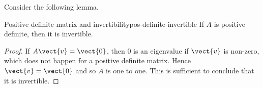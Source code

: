 
Consider the following lemma.

\begin{lemma}{Positive definite matrix and invertibility}{pos-definite-invertible}
If $A$ is positive definite, then it is invertible.
\end{lemma}

\begin{proof}
If $A\vect{v}=\vect{0}$, then $0$ is an eigenvalue if $\vect{v}$ is non-zero, which
does not happen for a positive definite matrix. Hence $\vect{v}=\vect{0}$ and
so $A$ is one to one. This is sufficient to conclude that it is invertible.
\end{proof}

